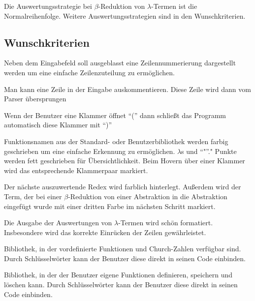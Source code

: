 \documentclass[parskip=full,11pt,twoside]{scrartcl}
\begin{document}
Die Auswertungsstrategie bei $\beta$-Reduktion von $\lambda$-Termen ist die Normalreihenfolge. Weitere Auswertungsstrategien sind in den Wunschkriterien.


\newpage
\subsection{Wunschkriterien}

Neben dem Eingabefeld soll ausgeblasst eine Zeilennummerierung dargestellt werden um eine einfache Zeilenzuteilung zu ermöglichen.

Man kann eine Zeile in der Eingabe auskommentieren. Diese Zeile wird dann vom Parser übersprungen

Wenn der Benutzer eine Klammer öffnet \enquote{(} dann schließt das Programm automatisch diese Klammer mit \enquote{)}

Funktionsnamen aus der Standard- oder Benutzerbibliothek werden farbig geschrieben um eine einfache Erkennung zu ermöglichen. $\lambda$s  und \enquote"." Punkte werden fett geschrieben für Übersichtlichkeit. Beim Hovern über einer Klammer wird das entsprechende Klammerpaar markiert.

Der nächste auszuwertende Redex wird farblich hinterlegt.
Außerdem wird der Term, der bei einer $\beta$-Reduktion von einer Abstraktion in die Abstraktion eingefügt wurde mit einer dritten Farbe im nächsten Schritt markiert.

Die Ausgabe der Auswertungen von $\lambda$-Termen wird schön formatiert. Insbesondere wird das korrekte Einrücken der Zeilen gewährleistet.

Bibliothek, in der vordefinierte Funktionen und Church-Zahlen verfügbar sind. Durch Schlüsselwörter kann der Benutzer diese direkt in seinen Code einbinden.

Bibliothek, in der der Benutzer eigene Funktionen definieren, speichern und löschen kann. Durch Schlüsselwörter kann der Benutzer diese direkt in seinen Code einbinden.
\end{document}
